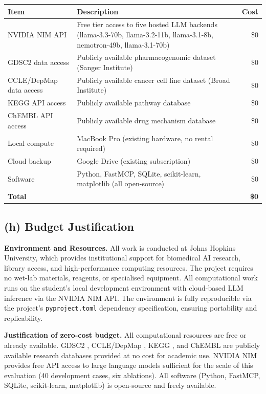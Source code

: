 \documentclass[11pt,letterpaper]{article}
\begin{document}
\begin{center}
\begin{tabular}{lp{8cm}r}
\toprule
\textbf{Item} & \textbf{Description} & \textbf{Cost} \\
\midrule
NVIDIA NIM API & Free tier access to five hosted LLM backends (llama-3.3-70b, llama-3.2-11b, llama-3.1-8b, nemotron-49b, llama-3.1-70b) & \$0 \\
GDSC2 data access & Publicly available pharmacogenomic dataset (Sanger Institute) & \$0 \\
CCLE/DepMap data access & Publicly available cancer cell line dataset (Broad Institute) & \$0 \\
KEGG API access & Publicly available pathway database & \$0 \\
ChEMBL API access & Publicly available drug mechanism database & \$0 \\
Local compute & MacBook Pro (existing hardware, no rental required) & \$0 \\
Cloud backup & Google Drive (existing subscription) & \$0 \\
Software & Python, FastMCP, SQLite, scikit-learn, matplotlib (all open-source) & \$0 \\
\midrule
\textbf{Total} & & \textbf{\$0} \\
\bottomrule
\end{tabular}
\end{center}

\subsection{(h) Budget Justification}

\textbf{Environment and Resources.}
All work is conducted at Johns Hopkins University, which provides institutional support for
biomedical AI research, library access, and high-performance computing resources. The project
requires no wet-lab materials, reagents, or specialised equipment. All computational work runs
on the student's local development environment with cloud-based LLM inference via the NVIDIA
NIM API. The environment is fully reproducible via the project's \texttt{pyproject.toml}
dependency specification, ensuring portability and replicability.

\textbf{Justification of zero-cost budget.}
All computational resources are free or already available. GDSC2 \cite{ref20}, CCLE/DepMap
\cite{ref19}, KEGG \cite{ref16}, and ChEMBL are publicly available research databases provided
at no cost for academic use. NVIDIA NIM provides free API access to large language models
sufficient for the scale of this evaluation (40 development cases, six ablations). All software
(Python, FastMCP, SQLite, scikit-learn, matplotlib) is open-source and freely available.
\end{document}
